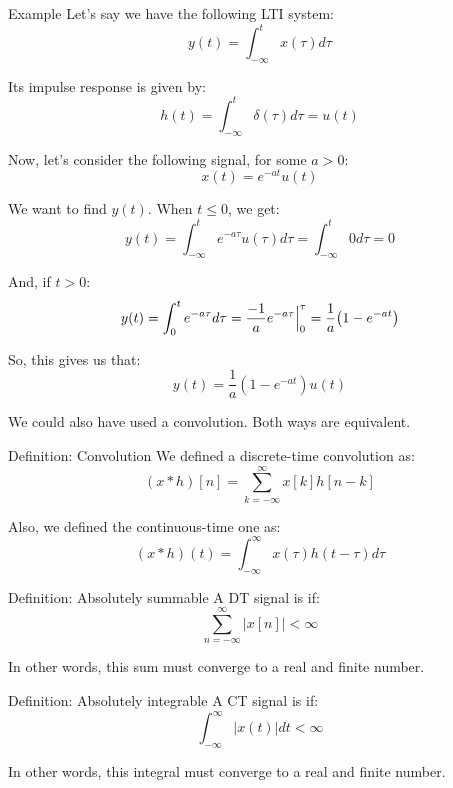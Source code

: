 \documentclass[a4paper]{article}
\begin{document}
\begin{parag}{Example}
    Let's say we have the following LTI system: 
    \[y\left(t\right) = \int_{-\infty}^{t} x\left(\tau\right)d\tau\]
    
    Its impulse response is given by: 
    \[h\left(t\right) = \int_{-\infty}^{t} \delta\left(\tau\right)d\tau = u\left(t\right)\]
    
    Now, let's consider the following signal, for some $a > 0$: 
    \[x\left(t\right) = e^{-at} u\left(t\right)\]
    
    We want to find $y\left(t\right)$. When $t \leq 0$, we get: 
    \[y\left(t\right) = \int_{-\infty}^{t} e^{-a\tau}u\left(\tau\right)d\tau = \int_{-\infty}^{t} 0 d\tau = 0\]

    And, if $t > 0$: 
    \[y\left(t\right) = \int_{0}^{t} e^{-a\tau} d\tau = \frac{-1}{a} e^{-a \tau} \eval_{0}^{\tau} = \frac{1}{a}\left(1 - e^{-at}\right)\]
    
    So, this gives us that: 
    \[y\left(t\right) = \frac{1}{a}\left(1 - e^{-at}\right)u\left(t\right)\]

    We could also have used a convolution. Both ways are equivalent.
\end{parag}

\begin{parag}{Definition: Convolution}
    We defined a discrete-time convolution as: 
    \[\left(x*h\right)\left[n\right] = \sum_{k=-\infty}^{\infty} x\left[k\right] h\left[n-k\right]\]
    
    Also, we defined the continuous-time one as: 
    \[\left(x*h\right)\left(t\right) = \int_{-\infty}^{\infty} x\left(\tau\right)h\left(t - \tau\right) d\tau\]
\end{parag}

\begin{parag}{Definition: Absolutely summable}
    A DT signal is  if: 
    \[\sum_{n=-\infty}^{\infty} \left|x\left[n\right]\right| < \infty\]

    In other words, this sum must converge to a real and finite number.
\end{parag}

\begin{parag}{Definition: Absolutely integrable}
    A CT signal is  if: 
    \[\int_{-\infty}^{\infty} \left|x\left(t\right)\right|dt < \infty\]

    In other words, this integral must converge to a real and finite number.
\end{parag}
\end{document}
